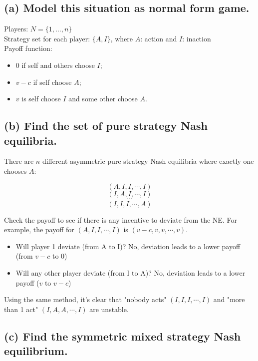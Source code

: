 \documentclass{article}
\begin{document}
\subsection*{(a) Model this situation as normal form game.}  


 Players: $N = \{1, \dots , n \}$ \\ 
 Strategy set for each player: $\{A, I \}$, where $A$: action and $I$: inaction \\ 
 Payoff function: 

\begin{itemize}
\item $0$ if self and others choose $I$; 
\item $v-c$ if self choose $A$; 
\item $v$ is self choose $I$ and some other choose $A$.
\end{itemize}




%
\subsection*{(b) Find the set of pure strategy Nash equilibria. } 

There are $n$ different asymmetric pure strategy Nash equilibria where exactly one chooses $A$:

$$(A,I,I,\cdots,I)$$
$$(I,A,I,\cdots,I)$$
$$\cdots$$
$$(I,I,I,\cdots,A)$$

\begin{mdframed}[backgroundcolor=blue!20,linecolor=white]

Check the payoff to see if there is any incentive to deviate from the NE. For example, the payoff for
$(A,I,I,\cdots,I)$ is $(v-c,v,v,\cdots,v)$.

\begin{itemize}
\item Will player 1 deviate (from A to I)? No, deviation leads to a lower payoff (from $v-c$ to $0$)
\item Will any other player deviate (from I to A)? No, deviation leads to a lower payoff ($v$ to $v-c$)
\end{itemize}

Using the same method, it's clear that "nobody acts" $(I,I,I,\cdots,I)$ and "more than 1 act" $(I,A,A,\cdots,I)$ are
unstable.
\end{mdframed}


\subsection*{(c) Find the symmetric mixed strategy Nash equilibrium.}
\end{document}

